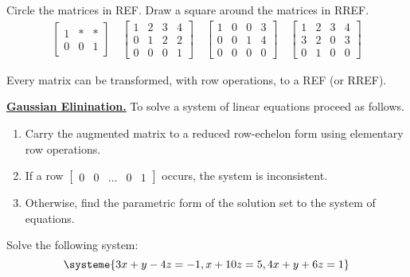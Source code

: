 \documentclass[20pt,a4paper]{extarticle}
\newcounter{example}[section]
\newcounter{theorem}
\begin{document}
\begin{example}
Circle the matrices in REF. Draw a square around the matrices in RREF.
\begin{align*}
\begin{bmatrix} 
1 & * & * \\ 0 & 0 & 1
\end{bmatrix}
\quad \begin{bmatrix} 1 & 2 & 3 & 4 \\ 0 & 1 & 2 & 2 \\ 0 & 0 & 0 & 1 \end{bmatrix}
\quad \begin{bmatrix} 1 & 0 & 0 & 3 \\ 0 & 0 & 1 & 4 \\ 0 & 0 & 0 & 0 \end{bmatrix} 
\quad \begin{bmatrix} 1 & 2 & 3 & 4 \\ 3 & 2 & 0 & 3 \\ 0 & 1 & 0 & 0 \end{bmatrix}
\end{align*}
\end{example}

\begin{theorem}
Every matrix can be transformed, with row operations, to a REF (or RREF).
\end{theorem}

\newpage

\begin{algorithm}\underline{\textbf{Gaussian Elinination.}}
To solve a system of linear equations proceed as follows.
	\begin{enumerate}[label=\arabic*.]
	\item Carry the augmented matrix to a reduced row-echelon form using elementary row operations.
	\item If a row $\begin{bmatrix} 0 & 0 & \ldots & 0 & 1 \end{bmatrix}$ occurs, the system is inconsistent.
	\item Otherwise, find the parametric form of the solution set to the system of equations.
	\end{enumerate}
\end{algorithm}

\begin{example}
Solve the following system:
	\[
		\systeme{3x + y - 4z = -1, x + 10z = 5, 4x + y + 6z = 1}
	\]
\end{example}
\end{document}

